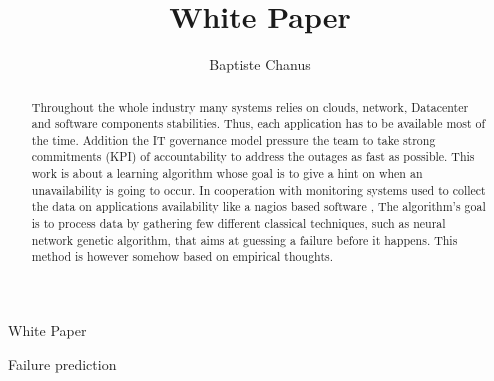 \documentclass[10pt,a4paper,oneside]{article}
\author{Baptiste Chanus}
\title{White Paper}
\begin{document}
\begin{center}
\begin{Huge}
White Paper
\end{Huge}
\vspace{0.8cm}

\begin{Large}
Failure prediction
\end{Large}
\end{center}

\vspace{0.8cm}

\begin{abstract}
	Throughout the whole industry many systems relies on clouds, network, Datacenter and software components stabilities. Thus, each application has to be available most of the time. Addition the IT governance model pressure the team to take strong commitments (KPI) of accountability to address the outages as fast as possible. This work is about a learning algorithm whose goal is to give a hint on when an unavailability is going to occur. In cooperation with monitoring systems used to collect the data on applications availability like a nagios based software , The algorithm's goal is to process data by gathering few different classical techniques, such as neural network genetic algorithm, that aims at guessing a failure before it happens. This method is however somehow based on empirical thoughts.
\end{abstract}

\vspace{1.2cm}
\end{document}
